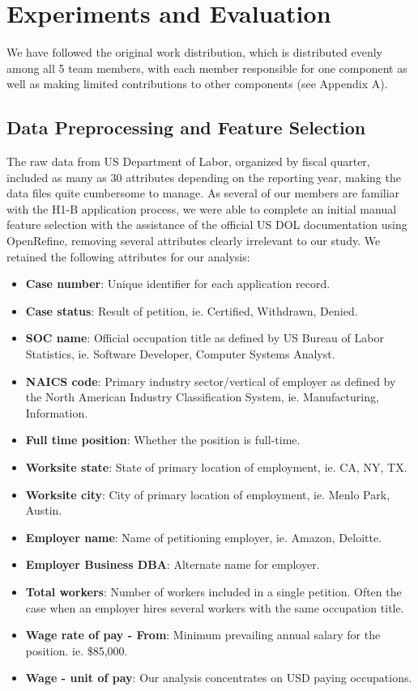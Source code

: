 \documentclass[sigconf]{acmart}
\begin{document}
\section{Experiments and Evaluation}

We have followed the original work distribution, which is distributed evenly among all 5 team members, 
with each member responsible for one component as well as making limited contributions to other components (see Appendix A). 


\subsection{Data Preprocessing and Feature Selection}

The raw data from US Department of Labor, organized by fiscal quarter, 
included as many as 30 attributes depending on the reporting year, 
making the data files quite cumbersome to manage. 
As several of our members are familiar with the H1-B application process, 
we were able to complete an initial manual feature selection with the assistance 
of the official US DOL documentation using OpenRefine, 
removing several attributes clearly irrelevant to our study. 
We retained the following attributes for our analysis:

  \begin{itemize}
    
  \item \textbf{Case number}: Unique identifier for each application record.
  \item \textbf{Case status}: Result of petition, 
  ie. Certified, Withdrawn, Denied. 
  \item \textbf{SOC name}: Official occupation title as defined by US Bureau of Labor Statistics, 
  ie. Software Developer, Computer Systems Analyst.
  \item \textbf{NAICS code}: Primary industry sector/vertical of employer as defined by 
  the North American Industry Classification System, 
  ie. Manufacturing, Information.
  \item \textbf{Full time position}: Whether the position is full-time.
  \item \textbf{Worksite state}: State of primary location of employment,
  ie. CA, NY, TX.
  \item \textbf{Worksite city}: City of primary location of employment, 
  ie. Menlo Park, Austin.
  \item \textbf{Employer name}: Name of petitioning employer,
  ie. Amazon, Deloitte.
  \item \textbf{Employer Business DBA}: Alternate name for employer. 
  \item \textbf{Total workers}: Number of workers included in a single petition. 
  Often the case when an employer hires several workers with the same occupation title. 
  \item \textbf{Wage rate of pay - From}: Minimum prevailing annual salary for the position.
  ie. \$85,000.
  \item \textbf{Wage - unit of pay}: Our analysis concentrates on USD paying occupations.

  \end{itemize}
\end{document}
